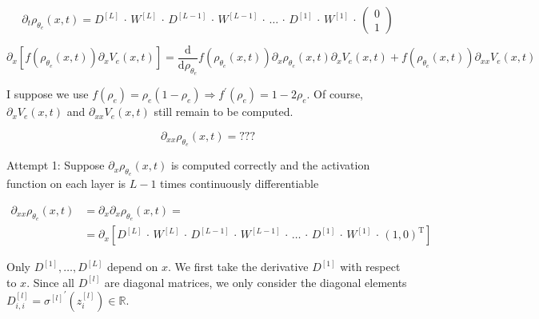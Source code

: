 \begin{equation*}
    \partial_t \rho_{\theta_e}(x, t) = D^{[L]} \, \cdot \, W^{[L]} \, \cdot \, D^{[L-1]} \, \cdot \, W^{[L-1]} \, \cdot \, \ldots \, \cdot \, D^{[1]} \, \cdot \, W^{[1]} \, \cdot \, \begin{pmatrix} 0 \\ 1 \end{pmatrix} 
\end{equation*}


\begin{equation*}
    \partial_x [f(\rho_{\theta_e}(x, t)) \partial_x V_e(x, t)] = \frac{\mathrm{d}}{\mathrm{d} \rho_{\theta_e}} f(\rho_{\theta_e}(x, t)) \partial_x \rho_{\theta_e}(x, t) \partial_x V_e(x, t) + f(\rho_{\theta_e}(x, t)) \partial_{xx} V_e(x, t)
\end{equation*}

I suppose we use $f(\rho_e) = \rho_e(1-\rho_e) \Rightarrow f^{\prime}(\rho_e) = 1 - 2 \rho_e$. Of course, $\partial_x V_e(x, t)$ and $\partial_{xx} V_e(x, t)$ still remain to be computed. 



\begin{equation*}
    \partial_{x x} \rho_{\theta_e}(x, t) = ???
\end{equation*}

Attempt 1: Suppose $\partial_x \rho_{\theta_e}(x, t)$ is computed correctly and the activation function on each layer is $L-1$ times continuously differentiable

\begin{align*}
    \partial_{x x} \rho_{\theta_e}(x, t) & = \partial_{x} \partial_{x} \rho_{\theta_e}(x, t) = \\
    & = \partial_{x} [D^{[L]} \, \cdot \, W^{[L]} \, \cdot \, D^{[L-1]} \, \cdot \, W^{[L-1]} \, \cdot \, \ldots \, \cdot \, D^{[1]} \, \cdot \, W^{[1]} \, \cdot \, (1, 0)^{\mathrm{T}}]
\end{align*}

Only $D^{[1]}, \ldots, D^{[L]}$ depend on $x$. We first take the derivative $D^{[1]}$ with respect to $x$. Since all $D^{[l]}$ are diagonal matrices, we only consider the diagonal elements $D_{i, i}^{[l]} = {\sigma^{[l]}}^{\prime} (z_{i}^{[l]}) \in \mathbb{R}$.  


